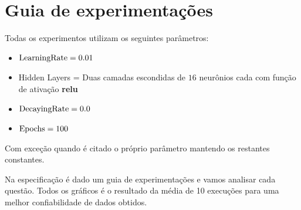 \newpage
\section{Guia de experimentações}

Todas os experimentos utilizam os seguintes parâmetros:

\begin{itemize}
    \item $\rm{Learning Rate} = 0.01$
    \item Hidden Layers = Duas camadas escondidas de $16$ neurônios cada com função de ativação \textbf{relu}
    \item $\rm{Decaying Rate} = 0.0$
    \item $\rm{Epochs} = 100$
\end{itemize}

Com exceção quando é citado o próprio parâmetro mantendo os restantes constantes.

Na especificação é dado um guia de experimentações e vamos analisar cada questão. Todos os gráficos é o resultado
da média de 10 execuções para uma melhor confiabilidade de dados obtidos.

